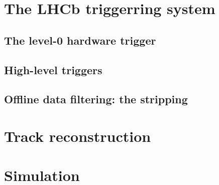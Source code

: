 

\section{The LHCb triggerring system} %
\label{sec:the_lhcb_triggerring_system}


\subsection{The level-0 hardware trigger} %
\label{sub:the_level_0_hardware_trigger}


\subsection{High-level triggers} %
\label{sub:high_level_triggers}


\subsection{Offline data filtering: the \lhcb stripping} %
\label{sub:offline_data_filtering_the_lhcb_stripping}



\section{Track reconstruction} %
\label{sec:reconstruction}



\section{Simulation} %
\label{sec:simulation}

